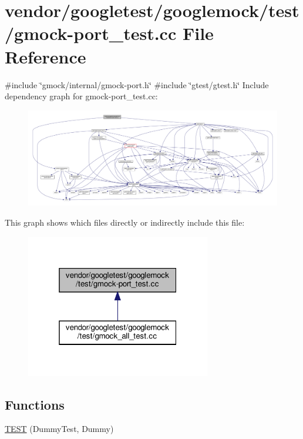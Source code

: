 \hypertarget{gmock-port__test_8cc}{}\section{vendor/googletest/googlemock/test/gmock-\/port\+\_\+test.cc File Reference}
\label{gmock-port__test_8cc}
{\ttfamily \#include \char`\"{}gmock/internal/gmock-\/port.\+h\char`\"{}}\newline
{\ttfamily \#include \char`\"{}gtest/gtest.\+h\char`\"{}}\newline
Include dependency graph for gmock-\/port\+\_\+test.cc\+:
\nopagebreak
\begin{figure}[H]
\begin{center}
\leavevmode
\includegraphics[width=350pt]{gmock-port__test_8cc__incl}
\end{center}
\end{figure}
This graph shows which files directly or indirectly include this file\+:
\nopagebreak
\begin{figure}[H]
\begin{center}
\leavevmode
\includegraphics[width=229pt]{gmock-port__test_8cc__dep__incl}
\end{center}
\end{figure}
\subsection*{Functions}
\begin{DoxyCompactItemize}
\item 
\hyperlink{gmock-port__test_8cc_a63812c9ef0cbc6907a251ccf919da78e}{T\+E\+ST} (Dummy\+Test, Dummy)
\end{DoxyCompactItemize}


